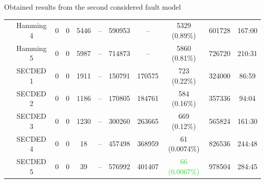 \begin{frame}{Obtained results from the second considered fault model}
\begin{table}[H]
\begin{tabular}{@{}ccccccccccc@{}}
                                                               & Hamming 4     & 0     & 0            & 5446  & --          & \num{590953}                             & --                                      & 5329 {\tiny (0.89\%)}                        & \num{601728} & 167:00                                  \\
                                                               & Hamming 5     & 0     & 0            & 5987  & --          & \num{714873}                             & --                                      & 5860 {\tiny (0.81\%)}                        & \num{726720} & 210:31                                  \\
                                                               & SECDED 1      & 0     & 0            & 1911  & --          & \num{150791}                             & \num{170575}                            & 723 {\tiny (0.22\%)}                         & \num{324000} & 86:59                                   \\
                                                               & SECDED 2      & 0     & 0            & 1186  & --          & \num{170805}                             & \num{184761}                            & 584 {\tiny (0.16\%)}                         & \num{357336} & 94:04                                   \\
                                                               & SECDED 3      & 0     & 0            & 1230  & --          & \num{300260}                             & \num{263665}                            & 669 {\tiny (0.12\%)}                         & \num{565824} & 161:30                                  \\
                                                               & SECDED 4      & 0     & 0            & 18    & --          & \num{457498}                             & \num{368959}                            & 61 {\tiny (0.0074\%)}                          & \num{826536} & 244:48                                  \\
                                                               & SECDED 5      & 0     & 0            & 39    & --          & \num{576992}                             & \num{401407}                            & \textcolor{LimeGreen}{66 {\tiny (0.0067\%)}}   & \num{978504} & 284:45                                  \\
            \bottomrule
        \end{tabular}
    \end{table}
\end{frame}

